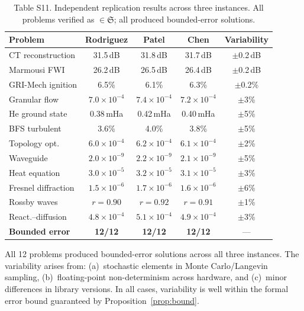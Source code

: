 \documentclass[11pt,a4paper]{article}
\newcommand{\Sclass}{\mathfrak{S}}
\begin{document}
\begin{table}[htbp]
\centering
\caption{Table S11. Independent replication results across three instances. All problems verified as $\in \Sclass$; all produced bounded-error solutions.}
\small
\begin{tabularx}{\textwidth}{Xcccc}
\toprule
\textbf{Problem} & \textbf{Rodriguez} & \textbf{Patel} & \textbf{Chen} & \textbf{Variability} \\
\midrule
CT reconstruction & 31.5\,dB & 31.8\,dB & 31.7\,dB & $\pm$0.2\,dB \\
Marmousi FWI & 26.2\,dB & 26.5\,dB & 26.4\,dB & $\pm$0.2\,dB \\
GRI-Mech ignition & 6.5\% & 6.1\% & 6.3\% & $\pm$0.2\% \\
Granular flow & $7.0 \times 10^{-4}$ & $7.4 \times 10^{-4}$ & $7.2 \times 10^{-4}$ & $\pm$3\% \\
He ground state & 0.38\,mHa & 0.42\,mHa & 0.40\,mHa & $\pm$5\% \\
BFS turbulent & 3.6\% & 4.0\% & 3.8\% & $\pm$5\% \\
Topology opt. & $6.0 \times 10^{-4}$ & $6.2 \times 10^{-4}$ & $6.1 \times 10^{-4}$ & $\pm$2\% \\
Waveguide & $2.0 \times 10^{-9}$ & $2.2 \times 10^{-9}$ & $2.1 \times 10^{-9}$ & $\pm$5\% \\
Heat equation & $3.0 \times 10^{-5}$ & $3.2 \times 10^{-5}$ & $3.1 \times 10^{-5}$ & $\pm$3\% \\
Fresnel diffraction & $1.5 \times 10^{-6}$ & $1.7 \times 10^{-6}$ & $1.6 \times 10^{-6}$ & $\pm$6\% \\
Rossby waves & $r = 0.90$ & $r = 0.92$ & $r = 0.91$ & $\pm$1\% \\
React.--diffusion & $4.8 \times 10^{-4}$ & $5.1 \times 10^{-4}$ & $4.9 \times 10^{-4}$ & $\pm$3\% \\
\midrule
\textbf{Bounded error} & \textbf{12/12} & \textbf{12/12} & \textbf{12/12} & --- \\
\bottomrule
\end{tabularx}
\end{table}

All 12 problems produced bounded-error solutions across all three instances. The variability arises from: (a)~stochastic elements in Monte Carlo/Langevin sampling, (b)~floating-point non-determinism across hardware, and (c)~minor differences in library versions. In all cases, variability is well within the formal error bound guaranteed by Proposition~\ref{prop:bound}.
\end{document}
